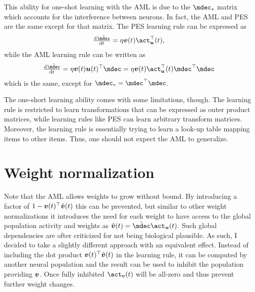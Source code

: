 This ability for one-shot learning with the AML is due to the $\mdec_*$ matrix which accounts for the interference between neurons.
In fact, the AML and PES are the same except for that matrix.
The PES learning rule can be expressed as
\begin{equation}
    \od{\tilde{\mdec}}{t} = \eta \vc v(t) \vc\act_{\vc u}\Tr(t) \text{,}
\end{equation}
while the AML learning rule can be written as
\begin{equation}
    \od{\tilde{\mdec}}{t} = \eta \vc v(t) \vc u(t)\Tr \mdec = \eta \vc v(t) \vc\act_{\vc u}\Tr(t) \mdec\Tr \mdec
\end{equation}
which is the same, except for $\mdec_* = \mdec\Tr \mdec$.

The one-short learning ability comes with some limitations, though.
The learning rule is restricted to learn transformations that can be expressed as outer product matrices, while learning rules like PES can learn arbitrary transform matrices.
Moreover, the learning rule is essentially trying to learn a look-up table mapping items to other items.
Thus, one should not expect the AML to generalize.


\section{Weight normalization}
Note that the AML allows weights to grow without bound.
By introducing a factor of $1 - \bm{v}(t)^{\top} \hat{\bm{v}}(t)$ this can be prevented, but similar to other weight normalizations it introduces the need for each weight to have access to the global population activity and weights as $\hat{\vc v}(t) = \tilde{\mdec} \vc\act_{\vc u}(t)$.
Such global dependencies are ofter criticized for not being biological plausible.
As such, I decided to take a slightly different approach with an equivalent effect.
Instead of including the dot product $\bm{v}(t)^{\top} \hat{\bm{v}}(t)$ in the learning rule, it can be computed by another neural population and the result can be used to inhibit the population providing $\bm{v}$.
Once fully inhibited $\vc\act_{\vc v}(t)$ will be all-zero and thus prevent further weight changes.


